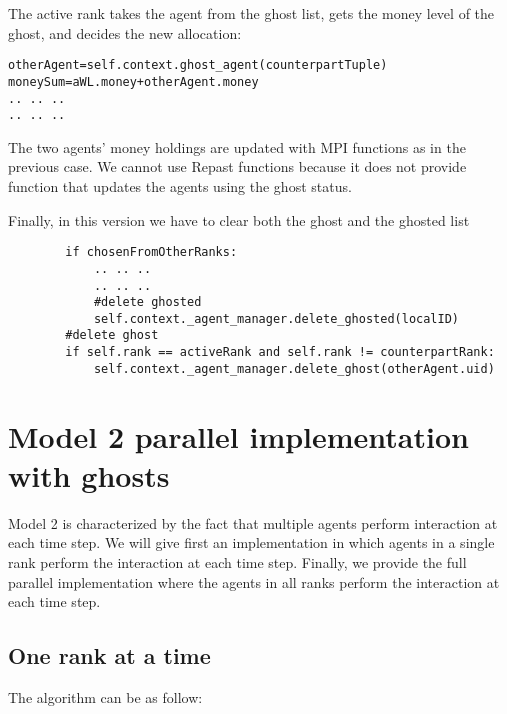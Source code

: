 \documentclass{article}
\begin{document}
The active rank takes the agent from the ghost list, gets the money level of the ghost, and decides the new allocation:
\begin{verbatim}
otherAgent=self.context.ghost_agent(counterpartTuple)     
moneySum=aWL.money+otherAgent.money
.. .. ..
.. .. ..
\end{verbatim}
The two agents' money holdings are updated with MPI functions as in the previous case. We cannot use Repast functions because it does not provide function that updates the agents using the ghost status.

Finally, in this version we have to clear both the ghost and the ghosted list
\begin{verbatim}
        if chosenFromOtherRanks:
            .. .. ..
            .. .. ..
            #delete ghosted
            self.context._agent_manager.delete_ghosted(localID)
        #delete ghost
        if self.rank == activeRank and self.rank != counterpartRank:
            self.context._agent_manager.delete_ghost(otherAgent.uid)
\end{verbatim}

\section{Model 2 parallel implementation with ghosts}
Model 2 is characterized by the fact that multiple agents perform interaction at each time step.
We will give first an implementation in which agents in a single rank perform the interaction at each time step. Finally, we provide the full parallel implementation where the agents in all ranks perform the interaction at each time step.
\subsection{One rank at a time}
The algorithm can be as follow:
\end{document}
